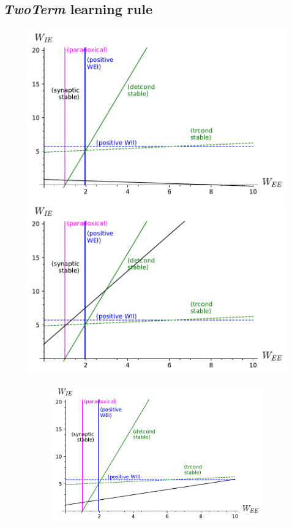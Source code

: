 \documentclass[twocolumn]{article}
\begin{document}
\subsection{{\em TwoTerm} learning rule}



\begin{figure}[!ht]
\centering
\parbox[c]{\columnwidth}{
\includegraphics[width=\columnwidth]{TT_stability_slowHomeo.pdf}
\includegraphics[width=\columnwidth]{TT_stability_slowCross.pdf}}
\parbox[c]{\columnwidth}{
\begin{figure}[H]
\includegraphics[width=\columnwidth]{TT_stability_equal.pdf}

\end{figure}}
\end{figure}
\end{document}
